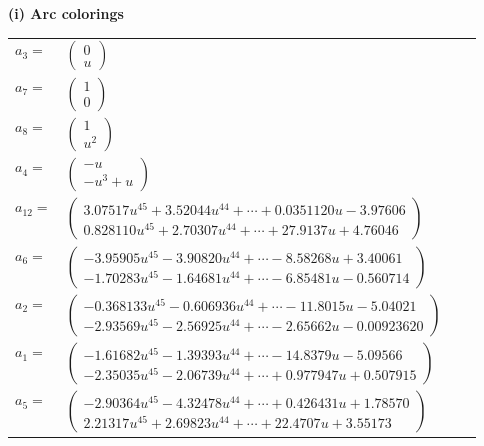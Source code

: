\documentclass[1p]{elsarticle_modified}
\theoremstyle{definition}
\begin{document}
\flushleft \textbf{(i) Arc colorings}\\
\begin{tabular}{m{7pt} m{180pt} m{7pt} m{180pt} }
\flushright $a_{3}=$&$\begin{pmatrix}0\\u\end{pmatrix}$ \\
\flushright $a_{7}=$&$\begin{pmatrix}1\\0\end{pmatrix}$ \\
\flushright $a_{8}=$&$\begin{pmatrix}1\\u^2\end{pmatrix}$ \\
\flushright $a_{4}=$&$\begin{pmatrix}- u\\- u^3+u\end{pmatrix}$ \\
\flushright $a_{12}=$&$\begin{pmatrix}3.07517 u^{45}+3.52044 u^{44}+\cdots+0.0351120 u-3.97606\\0.828110 u^{45}+2.70307 u^{44}+\cdots+27.9137 u+4.76046\end{pmatrix}$ \\
\flushright $a_{6}=$&$\begin{pmatrix}-3.95905 u^{45}-3.90820 u^{44}+\cdots-8.58268 u+3.40061\\-1.70283 u^{45}-1.64681 u^{44}+\cdots-6.85481 u-0.560714\end{pmatrix}$ \\
\flushright $a_{2}=$&$\begin{pmatrix}-0.368133 u^{45}-0.606936 u^{44}+\cdots-11.8015 u-5.04021\\-2.93569 u^{45}-2.56925 u^{44}+\cdots-2.65662 u-0.00923620\end{pmatrix}$ \\
\flushright $a_{1}=$&$\begin{pmatrix}-1.61682 u^{45}-1.39393 u^{44}+\cdots-14.8379 u-5.09566\\-2.35035 u^{45}-2.06739 u^{44}+\cdots+0.977947 u+0.507915\end{pmatrix}$ \\
\flushright $a_{5}=$&$\begin{pmatrix}-2.90364 u^{45}-4.32478 u^{44}+\cdots+0.426431 u+1.78570\\2.21317 u^{45}+2.69823 u^{44}+\cdots+22.4707 u+3.55173\end{pmatrix}$ \\

\end{tabular}
\end{document}
